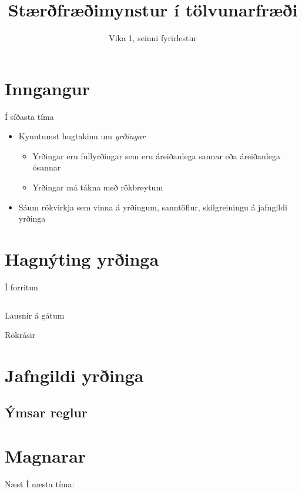 \documentclass[handout]{beamer}
\title{Stærðfræðimynstur í tölvunarfræði}
\subtitle{Vika 1, seinni fyrirlestur}
\begin{document}
\begin{frame}
\titlepage
\end{frame}

\section{Inngangur}

\begin{frame}{Í síðasta tíma}
\begin{itemize}
 \item Kynntumst hugtakinu um \emph{yrðingar}
 \begin{itemize}
  \item Yrðingar eru fullyrðingar sem eru áreiðanlega sannar eða áreiðanlega ósannar
  \item Yrðingar má tákna með rökbreytum
 \end{itemize}
 \item Sáum rökvirkja sem vinna á yrðingum, sanntöflur, skilgreiningu á jafngildi yrðinga
\end{itemize}
\end{frame}

\section{Hagnýting yrðinga}

\begin{frame}[fragile]{Í forritun}
\begin{columns}
\end{columns}
\end{frame}

\begin{frame}{Lausnir á gátum}

\end{frame}

\begin{frame}{Rökrásir}

\end{frame}

\section{Jafngildi yrðinga}

\subsection{Ýmsar reglur}

\section{Magnarar}


\begin{frame}{Næst}
Í næsta tíma:
\end{frame}
\end{document}
